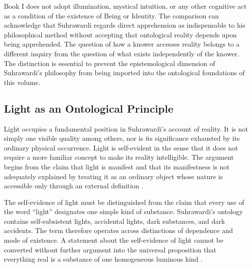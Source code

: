 \label{para:VS.B01.P01.C08.S14.SS04.P004}

Book I does not adopt illumination, mystical intuition,
or any other cognitive act as a condition of the existence
of Being or Identity. The comparison can acknowledge that
Suhrawardi regards direct apprehension as indispensable
to his philosophical method without accepting that
ontological reality depends upon being apprehended.
The question of how a knower accesses reality belongs
to a different inquiry from the question of what exists
independently of the knower. The distinction is essential
to prevent the epistemological dimension of Suhrawardi's
philosophy from being imported into the ontological
foundations of this volume.


\subsection{Light as an Ontological Principle}
\label{sec:ch08-s14-ss05}

\label{para:VS.B01.P01.C08.S14.SS05.P001}

Light occupies a fundamental position in Suhrawardi's
account of reality. It is not simply one visible quality
among others, nor is its significance exhausted by its
ordinary physical occurrence. Light is self-evident in
the sense that it does not require a more familiar concept
to make its reality intelligible. The argument begins
from the claim that light is manifest and that its
manifestness is not adequately explained by treating it
as an ordinary object whose nature is accessible only
through an external definition \citep[Part II, §§107--115]{SuhrawardiPhilosophyIllumination}.

\label{para:VS.B01.P01.C08.S14.SS05.P002}

The self-evidence of light must be distinguished from
the claim that every use of the word ``light'' designates
one simple kind of substance. Suhrawardi's ontology
contains self-subsistent lights, accidental lights,
dark substances, and dark accidents. The term therefore
operates across distinctions of dependence and mode
of existence. A statement about the self-evidence of
light cannot be converted without further argument
into the universal proposition that everything real
is a substance of one homogeneous luminous kind
\citep{WalbridgeLeavenAncients2000,MarcotteSuhrawardiSEP2019}.

